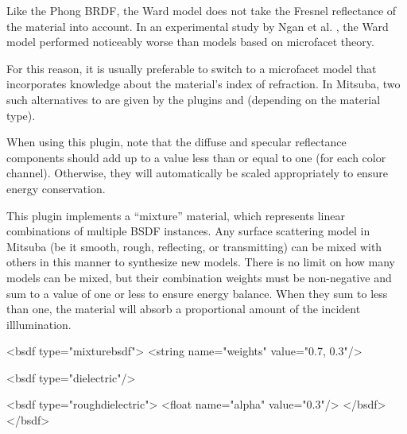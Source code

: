 Like the Phong BRDF, the Ward model does not take the Fresnel reflectance
of the material into account. In an experimental study by Ngan et al.
\cite{Ngan2005Experimental}, the Ward model performed noticeably worse than
models based on microfacet theory.

For this reason, it is usually preferable to switch to a microfacet model
that incorporates knowledge about the material's index of refraction. In Mitsuba,
two such alternatives to  are given by the plugins
 and  (depending on the
material type).

When using this plugin, note that the diffuse and specular reflectance
components should add up to a value less than or equal to one (for each
color channel). Otherwise, they will automatically be scaled appropriately
to ensure energy conservation.

This plugin implements a ``mixture'' material, which represents
linear combinations of multiple BSDF instances. Any surface scattering
model in Mitsuba (be it smooth, rough, reflecting, or transmitting) can
be mixed with others in this manner to synthesize new models. There
is no limit on how many models can be mixed, but their combination
weights must be non-negative and sum to a value of one or less to ensure
energy balance. When they sum to less than one, the material will
absorb a proportional amount of the incident illlumination.

\vspace{4mm}
\begin{xml}[caption={A material definition for a mixture of 70\% smooth
    and 30\% rough glass},
    label=lst:mixture-example]
<bsdf type="mixturebsdf">
    <string name="weights" value="0.7, 0.3"/>

    <bsdf type="dielectric"/>

    <bsdf type="roughdielectric">
        <float name="alpha" value="0.3"/>
    </bsdf>
</bsdf>
\end{xml}

